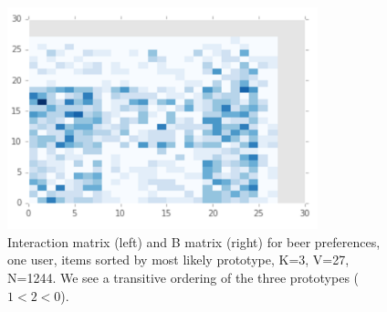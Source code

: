 \begin{figure}
\centering
\includegraphics[width=9cm]{images/interactions_beer}
\hfill{}
\caption{Interaction matrix (left) and B matrix (right) for beer preferences, one user, items sorted by most likely prototype, K=3, V=27, N=1244. We see a transitive ordering of the three prototypes ($1 < 2 < 0$).}
\label{fig:interactions_beer} 
\end{figure}
